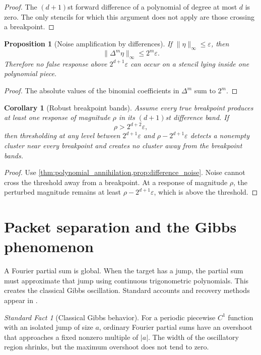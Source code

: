 \documentclass[11pt,letterpaper]{article}
\theoremstyle{plain}
\newtheorem{proposition}[proposition]{Proposition}
\theoremstyle{plain}
\theoremstyle{plain}
\newtheorem{corollary}[corollary]{Corollary}
\theoremstyle{definition}
\theoremstyle{definition}
\theoremstyle{definition}
\theoremstyle{definition}
\theoremstyle{remark}
\theoremstyle{remark}
\theoremstyle{remark}
\theoremstyle{remark}
\newtheorem{standardfact}[standardfact]{Standard Fact}
\begin{document}
\begin{proof}
The \((d+1)\)st forward difference of a polynomial of degree at most \(d\) is zero. The only stencils for which this argument does not apply are those crossing a breakpoint.
\end{proof}

\begin{proposition}[Noise amplification by differences]\label{prop:difference_noise}
If \(\|\eta\|_\infty\leq\varepsilon\), then
\[
\|\Delta^m\eta\|_\infty
\leq
2^m\varepsilon.
\]
Therefore no false response above \(2^{d+1}\varepsilon\) can occur on a stencil lying inside one polynomial piece.
\end{proposition}

\begin{proof}
The absolute values of the binomial coefficients in \(\Delta^m\) sum to \(2^m\).
\end{proof}

\begin{corollary}[Robust breakpoint bands]\label{cor:robust_breakpoint_bands}
Assume every true breakpoint produces at least one response of magnitude \(\rho\) in its \((d+1)\)st difference band. If
\[
\rho>2^{d+2}\varepsilon,
\]
then thresholding at any level between \(2^{d+1}\varepsilon\) and \(\rho-2^{d+1}\varepsilon\) detects a nonempty cluster near every breakpoint and creates no cluster away from the breakpoint bands.
\end{corollary}

\begin{proof}
Use \cref{thm:polynomial_annihilation,prop:difference_noise}. Noise cannot cross the threshold away from a breakpoint. At a response of magnitude \(\rho\), the perturbed magnitude remains at least \(\rho-2^{d+1}\varepsilon\), which is above the threshold.
\end{proof}

\section{Packet separation and the Gibbs phenomenon}\label{extension:section:11}\label{sec:gibbs}

A Fourier partial sum is global. When the target has a jump, the partial sum must approximate that jump using continuous trigonometric polynomials. This creates the classical Gibbs oscillation. Standard accounts and recovery methods appear in \cite{Zygmund2002,GottliebShu1997}.

\begin{standardfact}[Classical Gibbs behavior]\label{sf:gibbs_behavior}
For a periodic piecewise \(C^1\) function with an isolated jump of size \(a\), ordinary Fourier partial sums have an overshoot that approaches a fixed nonzero multiple of \(|a|\). The width of the oscillatory region shrinks, but the maximum overshoot does not tend to zero.
\end{standardfact}
\end{document}
